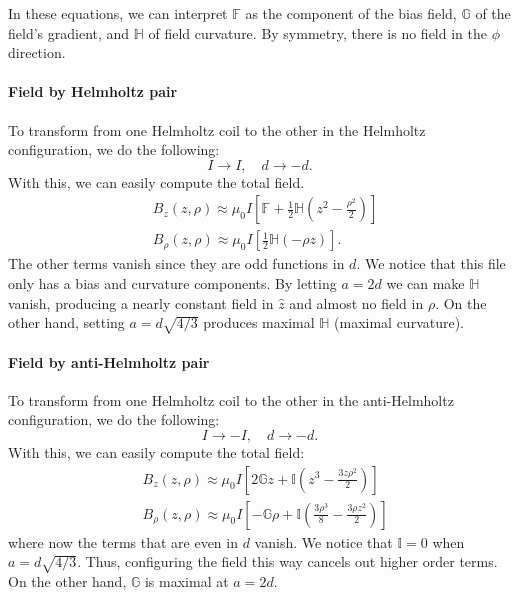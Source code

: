 \documentclass{book}
\theoremstyle{definition}
\newcommand{\f}[2]{\frac{#1}{#2}}
\newcommand{\lp}{\left(}
\newcommand{\rp}{\right)}
\newcommand{\lb}{\left[}
\newcommand{\rb}{\right]}
\begin{document}
In these equations, we can interpret $\mathbb{F}$ as the component of the bias field, $\mathbb{G}$ of the field's gradient, and $\mathbb{H}$ of field curvature.  By symmetry, there is no field in the $\phi$ direction. 


\paragraph*{Field by Helmholtz pair}
To transform from one Helmholtz coil to the other in the Helmholtz configuration, we do the following:
\begin{equation*}
I \to I, \quad d \to -d.
\end{equation*}
With this, we can easily compute the total field.  
\begin{align*}
&B_z(z,\rho) \approx \mu_0 I \lb \mathbb{F} + \f{1}{2}\mathbb{H} \lp z^2 - \f{\rho^2}{2} \rp  \rb\\
&B_\rho(z,\rho) \approx \mu_0 I \lb \f{1}{2}\mathbb{H}(-\rho z) \rb.
\end{align*}
The other terms vanish since they are odd functions in $d$. We notice that this file only has a bias and curvature components. By letting $a=2d$ we can make  $\mathbb{H}$ vanish, producing a nearly constant field in $\hat{z}$ and almost no field in $\rho$. On the other hand, setting $a = d\sqrt{4/3}$ produces maximal $\mathbb{H}$ (maximal curvature). 



\paragraph*{Field by anti-Helmholtz pair}

To transform from one Helmholtz coil to the other in the anti-Helmholtz configuration, we do the following:
\begin{equation*}
I \to -I, \quad d \to -d.
\end{equation*}
With this, we can easily compute the total field:
\begin{align*}
&B_z(z,\rho) \approx  \mu_0 I \lb 2\mathbb{G}z + \mathbb{I}\lp z^3 - \f{3z\rho^2}{2} \rp \rb\\
&B_\rho(z,\rho) \approx \mu_0 I \lb -\mathbb{G}\rho + \mathbb{I}\lp \f{3\rho^3}{8} - \f{3\rho z^2}{2} \rp \rb
\end{align*}
where now the terms that are even in $d$ vanish. We notice that $\mathbb{I} = 0$ when $a = d\sqrt{4/3}$. Thus, configuring the field this way cancels out higher order terms. On the other hand, $\mathbb{G}$ is maximal at $a = 2d$. 
\end{document}
